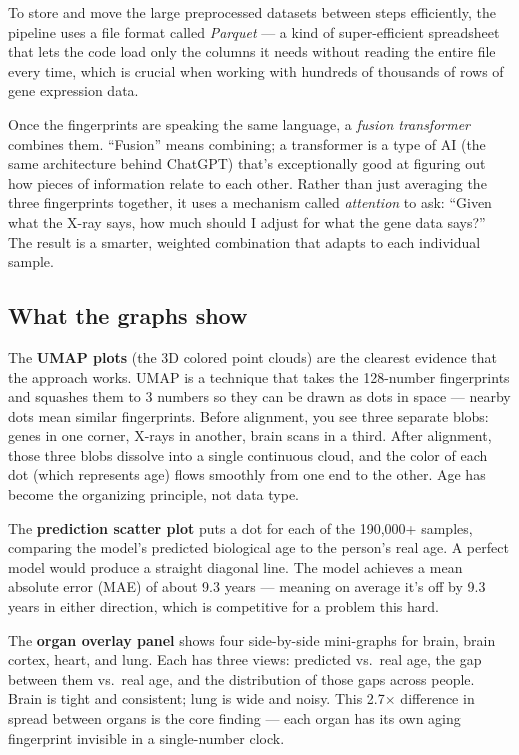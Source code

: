 \documentclass[11pt]{article}
\begin{document}
\begin{tcolorbox}[L1box]
To store and move the large preprocessed datasets between steps efficiently, the pipeline uses a file format called \textit{Parquet} --- a kind of super-efficient spreadsheet that lets the code load only the columns it needs without reading the entire file every time, which is crucial when working with hundreds of thousands of rows of gene expression data.

Once the fingerprints are speaking the same language, a \textit{fusion transformer} combines them. ``Fusion'' means combining; a transformer is a type of AI (the same architecture behind ChatGPT) that's exceptionally good at figuring out how pieces of information relate to each other. Rather than just averaging the three fingerprints together, it uses a mechanism called \textit{attention} to ask: ``Given what the X-ray says, how much should I adjust for what the gene data says?'' The result is a smarter, weighted combination that adapts to each individual sample.

\subsection{What the graphs show}

The \textbf{UMAP plots} (the 3D colored point clouds) are the clearest evidence that the approach works. UMAP is a technique that takes the 128-number fingerprints and squashes them to 3 numbers so they can be drawn as dots in space --- nearby dots mean similar fingerprints. Before alignment, you see three separate blobs: genes in one corner, X-rays in another, brain scans in a third. After alignment, those three blobs dissolve into a single continuous cloud, and the color of each dot (which represents age) flows smoothly from one end to the other. Age has become the organizing principle, not data type.

The \textbf{prediction scatter plot} puts a dot for each of the 190,000+ samples, comparing the model's predicted biological age to the person's real age. A perfect model would produce a straight diagonal line. The model achieves a mean absolute error (MAE) of about 9.3 years --- meaning on average it's off by 9.3 years in either direction, which is competitive for a problem this hard.

The \textbf{organ overlay panel} shows four side-by-side mini-graphs for brain, brain cortex, heart, and lung. Each has three views: predicted vs.\ real age, the gap between them vs.\ real age, and the distribution of those gaps across people. Brain is tight and consistent; lung is wide and noisy. This 2.7$\times$ difference in spread between organs is the core finding --- each organ has its own aging fingerprint invisible in a single-number clock.


\end{tcolorbox}
\end{document}
